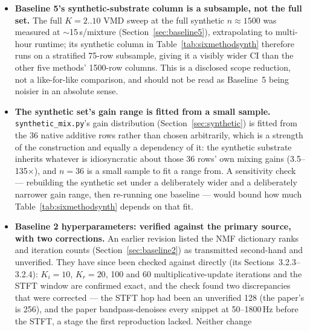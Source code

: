 \documentclass[11pt]{article}
\begin{document}
\begin{itemize}
    with a compute-budget-limited result rather than a converged one
    (Section~\ref{sec:baseline6}). Its results should be read as
    infrastructure validation, not as this project's best achievable neural
    result; a longer training budget and/or more aggressive on-the-fly
    augmentation are the natural next steps before treating Baseline~6's
    ranking against Baselines~1--5 as final.
  \item \textbf{Baseline 5's synthetic-substrate column is a subsample, not
    the full set.} The full $K{=}2..10$ VMD sweep at the full synthetic
    $n{\approx}1500$ was measured at $\sim$15\,s/mixture
    (Section~\ref{sec:baseline5}), extrapolating to multi-hour runtime; its
    synthetic column in Table~\ref{tab:sixmethodsynth} therefore runs on a
    stratified 75-row subsample, giving it a visibly wider CI than the
    other five methods' 1500-row columns. This is a disclosed scope
    reduction, not a like-for-like comparison, and should not be read as
    Baseline~5 being noisier in an absolute sense.
  \item \textbf{The synthetic set's gain range is fitted from a small
    sample.} \texttt{synthetic\_mix.py}'s gain distribution
    (Section~\ref{sec:synthetic}) is fitted from the 36 native additive rows
    rather than chosen arbitrarily, which is a strength of the construction
    and equally a dependency of it: the synthetic substrate inherits whatever
    is idiosyncratic about those 36 rows' own mixing gains
    (3.5--135$\times$), and $n{=}36$ is a small sample to fit a range from. A
    sensitivity check --- rebuilding the synthetic set under a deliberately
    wider and a deliberately narrower gain range, then re-running one
    baseline --- would bound how much Table~\ref{tab:sixmethodsynth} depends
    on that fit.
  \item \textbf{Baseline 2 hyperparameters: verified against the primary
    source, with two corrections.} An earlier revision listed the NMF
    dictionary ranks and iteration counts (Section~\ref{sec:baseline2}) as
    transmitted second-hand and unverified. They have since been checked
    against \cite{nmfcrnn} directly (its Sections~3.2.3--3.2.4): $K_i{=}10$,
    $K_r{=}20$, 100 and 60 multiplicative-update iterations and the STFT
    window are confirmed exact, and the check found two discrepancies that
    were corrected --- the STFT hop had been an unverified 128 (the paper's
    is 256), and the paper bandpass-denoises every snippet at 50--1800\,Hz
    before the STFT, a stage the first reproduction lacked. Neither change

\end{itemize}
\end{document}

